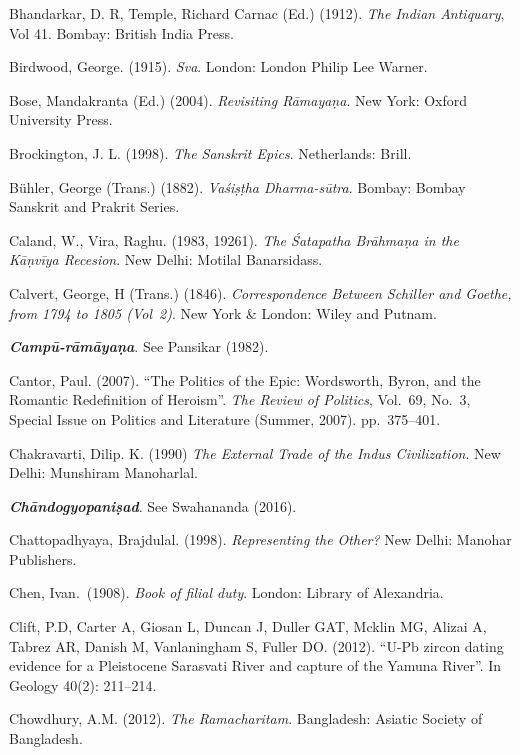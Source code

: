 \begin{thebibliography}{99}
Bhandarkar, D. R, Temple, Richard Carnac (Ed.) (1912). {\sl The Indian Antiquary}, Vol 41. Bombay: British India Press. 

Birdwood, George. (1915). {\sl Sva}. London: London Philip Lee Warner. 

Bose, Mandakranta (Ed.) (2004). {\sl Revisiting Rāmayaṇa}. New York: Oxford University Press.

Brockington, J. L. (1998). {\sl The Sanskrit Epics}. Netherlands: Brill.

Bühler, George (Trans.) (1882). {\sl Vaśiṣṭha Dharma-sūtra}. Bombay: Bombay Sanskrit and Prakrit Series. 

Caland, W., Vira, Raghu. (1983, 19261). {\sl The Śatapatha Brāhmaṇa in the Kāṇvīya Recesion}. New Delhi: Motilal Banarsidass. 

Calvert, George, H (Trans.) (1846). {\sl Correspondence Between Schiller and Goethe, from 1794 to 1805 (Vol~2)}. New York \& London: Wiley and Putnam.  

{\sl\bfseries Campū-rāmāyaṇa}. See Pansikar (1982).

Cantor, Paul. (2007). “The Politics of the Epic: Wordsworth, Byron, and the Romantic Redefinition of Heroism”. {\sl The Review of Politics}, Vol.~69, No.~3, Special Issue on Politics and Literature (Summer, 2007). pp.~375--401.

Chakravarti, Dilip. K. (1990) {\sl The External Trade of the Indus Civilization}. New Delhi: Munshiram Manoharlal. 

{\sl\bfseries Chāndogyopaniṣad}. See Swahananda (2016).

Chattopadhyaya, Brajdulal. (1998). {\sl Representing the Other?} New Delhi: Manohar Publishers. 

Chen, Ivan.\ (1908). {\sl Book of filial duty}. London: Library of Alexandria. 

Clift, P.D, Carter A, Giosan L, Duncan J, Duller GAT, Mcklin MG, Alizai A, Tabrez AR, Danish M, Vanlaningham S, Fuller DO. (2012). “U-Pb zircon dating evidence for a Pleistocene Sarasvati River and capture of the Yamuna River”. In Geology 40(2): 211--214.

Chowdhury, A.M. (2012). {\sl The Ramacharitam}. Bangladesh: Asiatic Society of Bangladesh. 


\end{thebibliography}
